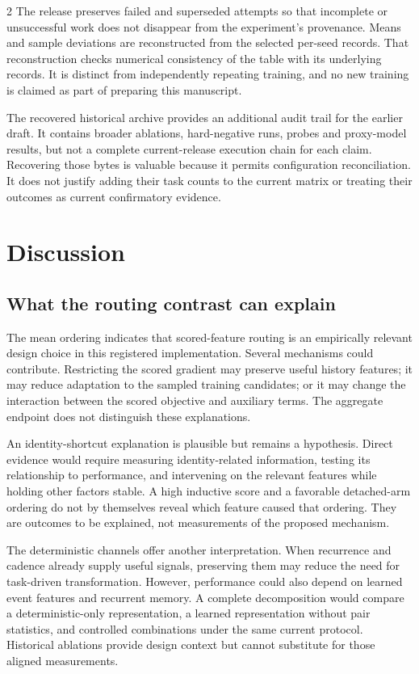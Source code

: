 \documentclass[a4paper,10pt]{article}
\begin{document}
\begin{multicols}{2}
The release preserves failed and superseded attempts so that incomplete or unsuccessful work does not disappear from the experiment's provenance. Means and sample deviations are reconstructed from the selected per-seed records. That reconstruction checks numerical consistency of the table with its underlying records. It is distinct from independently repeating training, and no new training is claimed as part of preparing this manuscript.

The recovered historical archive provides an additional audit trail for the earlier draft. It contains broader ablations, hard-negative runs, probes and proxy-model results, but not a complete current-release execution chain for each claim. Recovering those bytes is valuable because it permits configuration reconciliation. It does not justify adding their task counts to the current matrix or treating their outcomes as current confirmatory evidence.

\section{Discussion}
\subsection{What the routing contrast can explain}
The mean ordering indicates that scored-feature routing is an empirically relevant design choice in this registered implementation. Several mechanisms could contribute. Restricting the scored gradient may preserve useful history features; it may reduce adaptation to the sampled training candidates; or it may change the interaction between the scored objective and auxiliary terms. The aggregate endpoint does not distinguish these explanations.

An identity-shortcut explanation is plausible but remains a hypothesis. Direct evidence would require measuring identity-related information, testing its relationship to performance, and intervening on the relevant features while holding other factors stable. A high inductive score and a favorable detached-arm ordering do not by themselves reveal which feature caused that ordering. They are outcomes to be explained, not measurements of the proposed mechanism.

The deterministic channels offer another interpretation. When recurrence and cadence already supply useful signals, preserving them may reduce the need for task-driven transformation. However, performance could also depend on learned event features and recurrent memory. A complete decomposition would compare a deterministic-only representation, a learned representation without pair statistics, and controlled combinations under the same current protocol. Historical ablations provide design context but cannot substitute for those aligned measurements.


\end{multicols}
\end{document}
